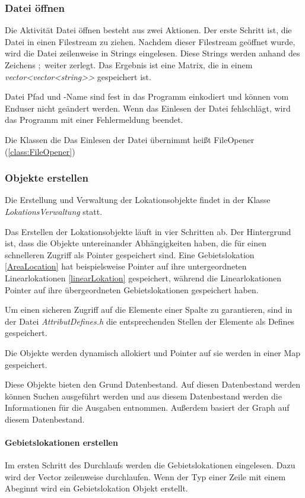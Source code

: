 \documentclass[12pt, a4paper, ngerman]{article}
\begin{document}
\subsubsection{Datei öffnen \label{dateiOeffnen}}
Die Aktivität Datei öffnen besteht aus zwei Aktionen. Der erste Schritt ist, die Datei in einen Filestream zu ziehen. Nachdem dieser Filestream geöffnet wurde, wird die Datei zeilenweise in Strings eingelesen. Diese Strings werden anhand des Zeichens \glqq ;\grqq~weiter zerlegt. Das Ergebnis ist eine Matrix, die in einem \textit{vector\textless vector\textless string\textgreater \textgreater} gespeichert ist.

Datei Pfad und -Name sind fest in das Programm einkodiert und können vom Enduser nicht geändert werden. Wenn das Einlesen der Datei fehlschlägt, wird das Programm mit einer Fehlermeldung beendet.

Die Klassen die Das Einlesen der Datei übernimmt heißt FileOpener (\ref{class:FileOpener})
\subsubsection{Objekte erstellen \label{objekteErstellen}}
Die Erstellung und Verwaltung der Lokationsobjekte findet in der Klasse \textit{LokationsVerwaltung} statt. 

Das Erstellen der Lokationsobjekte läuft in vier Schritten ab. Der Hintergrund ist, dass die Objekte untereinander Abhängigkeiten haben, die für einen schnelleren Zugriff als Pointer gespeichert sind. Eine Gebietslokation  \ref{AreaLocation} hat beispielsweise Pointer auf ihre untergeordneten Linearlokationen \ref{linearLokation} gespeichert, während die Linearlokationen Pointer auf ihre übergeordneten Gebietslokationen gespeichert haben.

Um einen sicheren Zugriff auf die Elemente einer Spalte zu garantieren, sind in der Datei \textit{AttributDefines.h} die entsprechenden Stellen der Elemente als Defines gespeichert.

Die Objekte werden dynamisch allokiert und Pointer auf sie werden in einer Map gespeichert.  

Diese Objekte bieten den Grund Datenbestand. Auf diesen Datenbestand werden können Suchen ausgeführt werden und aus diesem Datenbestand werden die Informationen für die Ausgaben entnommen. Außerdem basiert der Graph auf diesem Datenbestand.

\paragraph{Gebietslokationen erstellen \label{par:gebietsLokationenErstellen}}
Im ersten Schritt des Durchlaufs werden die Gebietslokationen eingelesen. Dazu wird der Vector zeilenweise durchlaufen. Wenn der Typ einer Zeile mit einem \glqq A\grqq  beginnt wird ein Gebietslokation Objekt erstellt.
\end{document}
